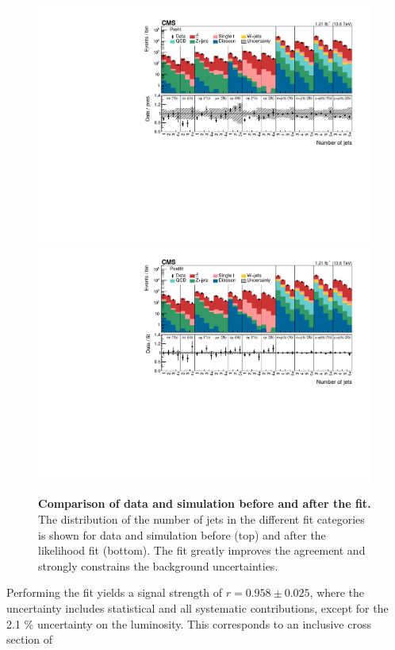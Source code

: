 \begin{figure}[!ht]
\centering
\includegraphics[width=0.99\textwidth]{figures/ttxs/prefithist.pdf}
\includegraphics[width=0.99\textwidth]{figures/ttxs/postfithist.pdf}

\caption{
   \textbf{Comparison of data and simulation before and after the fit.} The distribution of the number of jets in the different fit categories is shown for data and simulation before (top) and after the likelihood fit (bottom). The fit greatly improves the agreement and strongly constrains the background uncertainties.
}
\label{fig:ttxs:prepostfit}
\end{figure}

Performing the fit yields a \ttbar signal strength of $r = 0.958 \pm 0.025$, where the uncertainty includes statistical and all systematic contributions, except for the 2.1 \% uncertainty on the luminosity. This corresponds to an inclusive \ttbar cross section of

